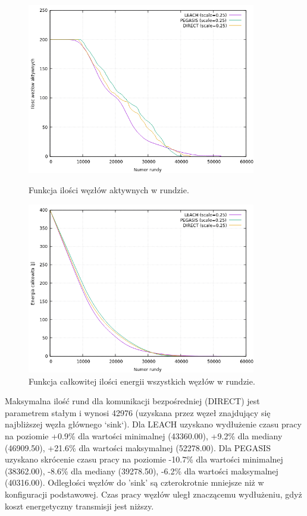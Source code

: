 \documentclass[a4paper,12pt,twoside,openany]{report}
\begin{document}
\begin{figure}[H]
 \centering
 \includegraphics[width=10cm]{images/gnuplot/test_3/nodes_in_round_xy050.png}
 \caption{Funkcja ilości węzłów aktywnych w rundzie.}
 \includegraphics[width=10cm]{images/gnuplot/test_3/energy_in_round_xy050.png}
 \caption{Funkcja całkowitej ilości energii wszystkich węzłów w rundzie.}
\end{figure}

\par
Maksymalna ilość rund dla komunikacji bezpośredniej (DIRECT) jest parametrem stałym i wynosi 42976 (uzyskana przez węzeł znajdujący się najbliższej węzła głównego `sink`).
Dla LEACH uzyskano wydłużenie czasu pracy na poziomie +0.9\% dla wartości minimalnej (43360.00), +9.2\% dla mediany (46909.50), +21.6\% dla wartości maksymalnej (52278.00).
Dla PEGASIS uzyskano skrócenie czasu pracy na poziomie -10.7\% dla wartości minimalnej (38362.00), -8.6\% dla mediany (39278.50), -6.2\% dla wartości maksymalnej (40316.00).
Odległości węzłów do 'sink' są czterokrotnie mniejsze niż w konfiguracji podstawowej. Czas pracy węzłów uległ znaczącemu wydłużeniu, gdyż koszt energetyczny transmisji jest niższy.
\end{document}
